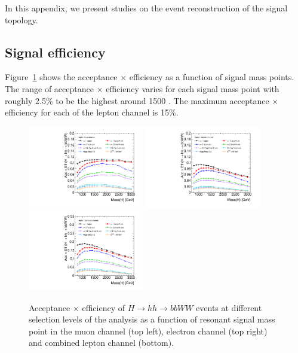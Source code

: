 In this appendix, we present studies on the event reconstruction of the signal topology.

\subsection{Signal efficiency} 

Figure~\ref{fig:boosted_signaleff} shows the acceptance $\times$ efficiency as a function of signal mass points. The range of 
acceptance $\times$ efficiency varies for each signal mass point with roughly 2.5\% to be the highest around 1500 \GeV. The maximum 
acceptance $\times$ efficiency for each of the lepton channel is 15\%.


\begin{figure}[!htbp]
\begin{center}
\includegraphics*[width=0.45\textwidth]{./figures/boosted/signaleff_muon}
\includegraphics*[width=0.45\textwidth]{./figures/boosted/signaleff_elec}\\
\includegraphics*[width=0.45\textwidth]{./figures/boosted/signaleff_lepton}
\caption{Acceptance $\times$ efficiency of $H\rightarrow hh \rightarrow bbWW$ events at different 
selection levels of the analysis as a function of resonant signal mass point in the muon channel (top left), 
electron channel (top right) and combined lepton channel (bottom).}
\label{fig:boosted_signaleff}
\end{center}
\end{figure}


